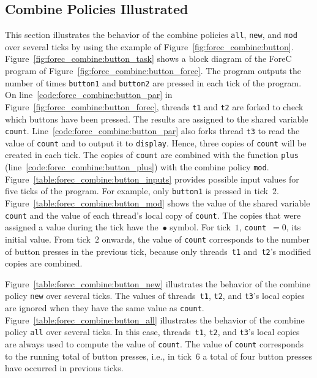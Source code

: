 \subsection{Combine Policies Illustrated}
\label{sec:forec_combine:policies}
This section illustrates the behavior of the combine
policies \verb$all$, \verb$new$, and \verb$mod$ over
several ticks by using the example of
Figure~\ref{fig:forec_combine:button}.
Figure~\ref{fig:forec_combine:button_task} shows a block
diagram of the ForeC program of
Figure~\ref{fig:forec_combine:button_forec}. The
program outputs the number of times \texttt{button1} and
\texttt{button2} are pressed in each tick of the
program. On line~\ref{code:forec_combine:button_par} in
Figure~\ref{fig:forec_combine:button_forec}, threads
\verb$t1$ and \verb$t2$ are forked to check which 
buttons have been pressed. The results are assigned to the
shared variable \verb$count$.
Line~\ref{code:forec_combine:button_par} also forks thread
\verb$t3$ to read the value of \verb$count$ and to output it to
\verb$display$. Hence, three copies of \verb$count$ will be
created in each tick. The copies of
\verb$count$ are combined with the function \verb$plus$
(line~\ref{code:forec_combine:button_plus}) with 
the combine policy \texttt{mod}.
Figure~\ref{table:forec_combine:button_inputs} provides
possible input values for five ticks of the program.
For example, only \texttt{button1} is pressed in tick~$2$. 
Figure~\ref{table:forec_combine:button_mod}
shows the value of the shared variable
\texttt{count} and the value of each thread's local copy of \texttt{count}. 
The copies that were assigned a value during the
tick have the~$\bullet$ symbol. For tick~$1$, \texttt{count}~$= 0$, 
its initial value. From tick~$2$ 
onwards, the value of \texttt{count} corresponds to the number of 
button presses in the previous tick, because only
threads~\texttt{t1} and~\texttt{t2}'s modified copies are
combined.

Figure~\ref{table:forec_combine:button_new} illustrates the 
behavior of the combine policy \texttt{new} over several
ticks. The values of threads~\texttt{t1}, 
\texttt{t2}, and \texttt{t3}'s local copies 
are ignored when they have the same value as \texttt{count}.
Figure~\ref{table:forec_combine:button_all} illustrates the 
behavior of the combine policy \texttt{all} over several
ticks. In this case, threads~\texttt{t1}, \texttt{t2},
and \texttt{t3}'s local copies are always used
to compute the value of \texttt{count}. 
The value of \texttt{count} corresponds to the running
total of button presses, i.e., in tick~$6$ a total of four
button presses have occurred in previous ticks.

